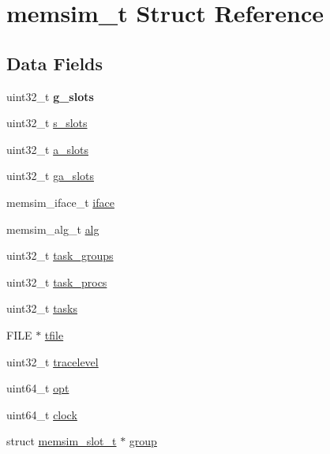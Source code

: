 \hypertarget{structmemsim__t}{\section{memsim\-\_\-t Struct Reference}
\label{structmemsim__t}
}
\subsection*{Data Fields}
\begin{DoxyCompactItemize}
\item 
\hypertarget{structmemsim__t_a31602ed79156df735349134ab61d1c2a}{uint32\-\_\-t {\bfseries g\-\_\-slots}}\label{structmemsim__t_a31602ed79156df735349134ab61d1c2a}

\item 
uint32\-\_\-t \hyperlink{structmemsim__t_a35adeb1c88dde11bfe128119c723c037}{s\-\_\-slots}
\item 
uint32\-\_\-t \hyperlink{structmemsim__t_a855dbf0b36cad4e37ccb8dcb26caa864}{a\-\_\-slots}
\item 
uint32\-\_\-t \hyperlink{structmemsim__t_af10e3ad73189bf418d29478bb4de5eb2}{ga\-\_\-slots}
\item 
memsim\-\_\-iface\-\_\-t \hyperlink{structmemsim__t_a37831c21b74789b55a12495be077d120}{iface}
\item 
memsim\-\_\-alg\-\_\-t \hyperlink{structmemsim__t_ae9ec2da913a82a570dae07d3ae8d09b3}{alg}
\item 
uint32\-\_\-t \hyperlink{structmemsim__t_ac893c94cb9e4cb525baa4a4352ef6269}{task\-\_\-groups}
\item 
uint32\-\_\-t \hyperlink{structmemsim__t_a13c682d9789b022f02fbeafcdc2a0866}{task\-\_\-procs}
\item 
uint32\-\_\-t \hyperlink{structmemsim__t_a907d500eb21a9b3c8813ed0e639d806c}{tasks}
\item 
F\-I\-L\-E $\ast$ \hyperlink{structmemsim__t_a0bdb5e96cb3acca8a4ec5daea271243d}{tfile}
\item 
uint32\-\_\-t \hyperlink{structmemsim__t_a5adec994c4699e314a35284102cb1cb3}{tracelevel}
\item 
uint64\-\_\-t \hyperlink{structmemsim__t_a34e92877e65240907a70bbfe16fd4a34}{opt}
\item 
uint64\-\_\-t \hyperlink{structmemsim__t_a09a7513daf69ea79d15c89b11efe5431}{clock}
\item 
struct \hyperlink{structmemsim__slot__t}{memsim\-\_\-slot\-\_\-t} $\ast$ \hyperlink{structmemsim__t_a0569d3661744c965a6620ca75563144d}{group}

\end{DoxyCompactItemize}
